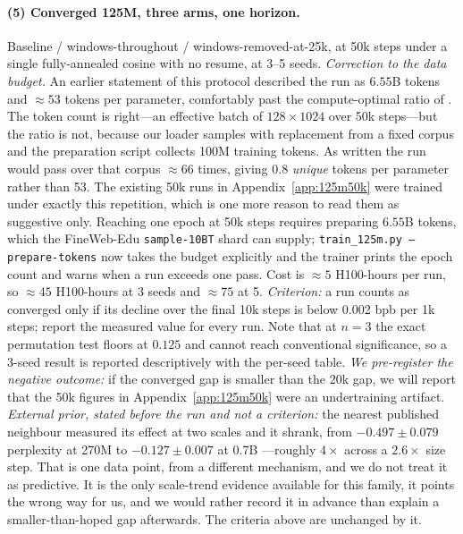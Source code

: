\documentclass[11pt,a4paper]{article}
\begin{document}
\paragraph{(5) Converged 125M, three arms, one horizon.} Baseline / windows-throughout / windows-removed-at-25k, at 50k steps under a single fully-annealed cosine with no resume, at 3--5 seeds. \emph{Correction to the data budget.} An earlier statement of this protocol described the run as $6.55$B tokens and ${\approx}53$ tokens per parameter, comfortably past the compute-optimal ratio of \citet{hoffmann2022chinchilla}. The token count is right---an effective batch of $128 \times 1024$ over 50k steps---but the ratio is not, because our loader samples with replacement from a fixed corpus and the preparation script collects 100M training tokens. As written the run would pass over that corpus ${\approx}66$ times, giving $0.8$ \emph{unique} tokens per parameter rather than 53. The existing 50k runs in Appendix~\ref{app:125m50k} were trained under exactly this repetition, which is one more reason to read them as suggestive only. Reaching one epoch at 50k steps requires preparing $6.55$B tokens, which the FineWeb-Edu \texttt{sample-10BT} shard can supply; \texttt{train\_125m.py --prepare-tokens} now takes the budget explicitly and the trainer prints the epoch count and warns when a run exceeds one pass. Cost is ${\approx}5$ H100-hours per run, so ${\approx}45$ H100-hours at 3 seeds and ${\approx}75$ at 5. \emph{Criterion:} a run counts as converged only if its decline over the final 10k steps is below 0.002 bpb per 1k steps; report the measured value for every run. Note that at $n=3$ the exact permutation test floors at $0.125$ and cannot reach conventional significance, so a 3-seed result is reported descriptively with the per-seed table. \emph{We pre-register the negative outcome:} if the converged gap is smaller than the 20k gap, we will report that the 50k figures in Appendix~\ref{app:125m50k} were an undertraining artifact. \emph{External prior, stated before the run and not a criterion:} the nearest published neighbour measured its effect at two scales and it shrank, from $-0.497 \pm 0.079$ perplexity at 270M to $-0.127 \pm 0.007$ at 0.7B \citep{zhu2026learningless}---roughly $4\times$ across a $2.6\times$ size step. That is one data point, from a different mechanism, and we do not treat it as predictive. It is the only scale-trend evidence available for this family, it points the wrong way for us, and we would rather record it in advance than explain a smaller-than-hoped gap afterwards. The criteria above are unchanged by it.
\end{document}

